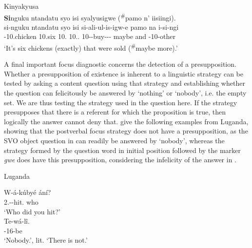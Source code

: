 \documentclass[output=paper]{langscibook}
\begin{document}
\ea
\label{bkm:Ref131663261}
Kinyakyusa \citep{vanderWalLusekelo2022}\\
\textbf{Si}nguku ntandatu syo isi syalyusigwe (\textsuperscript{\#}pamo n’ iisiingi).\\
\gll
si-nguku  ntandatu  syo  isi  si-ali-ul-is-igw-e   pamo  na  i-si-ngi  \\
\EXH{}-10.chicken  10.six  10.\IDCOP{}  10.\DEM{}.\PROX{}  10\SM{}-\PST{}-buy-\CAUS-\PASS{}-\FV{} maybe  and  \AUG{}-10-other\\
\glt
‘It’s six chickens (exactly) that were sold (\textsuperscript{\#}maybe more).’\\


\z

A final important focus diagnostic concerns the detection of a presupposition. Whether a presupposition of existence is inherent to a linguistic strategy can be tested by asking a content question using that strategy and establishing whether the question can felicitously be answered by ‘nothing’ or ‘nobody’, i.e. the empty set. We are thus testing the strategy used in the question here. If the strategy presupposes that there is a referent for which the proposition is true, then logically the answer cannot deny that.  give the following examples from Luganda, showing that the postverbal focus strategy does not have a presupposition, as the SVO object question in  can readily be answered by ‘nobody’, whereas the strategy formed by the question word in initial position followed by the marker \textit{gwe} does have this presupposition, considering the infelicity of the answer in .

\ea
Luganda \citep[360]{vanderWalNamyalo2016}\\
\label{bkm:Ref134776868}
\begin{xlist}
\gll
W-á-kúbyé  ání? \\
2\SG{}.\SM{}-\PST{}-hit.\PFV{}  who\\
\glt
‘Who did you hit?’\\

\gll
Te-wá-lî. \\
\NEG{}-16\SM{}-be\\
\glt
‘Nobody.’, lit. ‘There is not.’

\end{xlist}
\z
\end{document}
